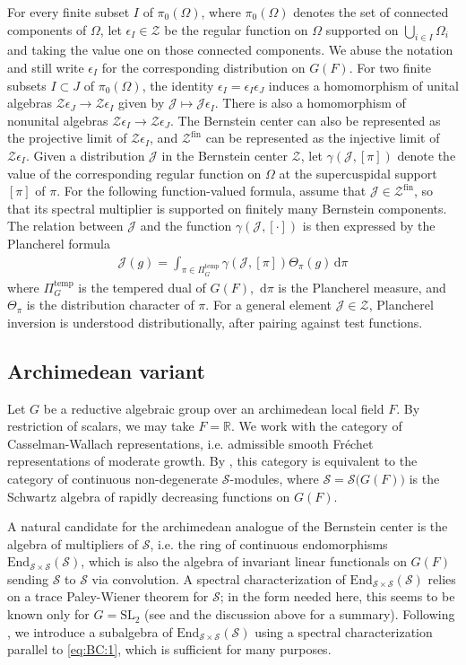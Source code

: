\documentclass[iccmp]{ipbook}
\newcommand{\BR}{{\mathbb {R}}}
\newcommand{\CJ}{{\mathcal {J}}}
\newcommand{\CS}{{\mathcal {S}}}
\newcommand{\CZ}{{\mathcal {Z}}}
\newcommand{\End}{{\mathrm{End}}}
\newcommand{\SL}{{\mathrm{SL}}}
\newcommand{\ud}{\,\mathrm{d}}
\def\eps{{\epsilon}}
\def\Ome{{\Omega}}
\def\gam{{\gamma}}
\newcommand{\fin}{\mathrm{fin}}
\def\temp{\mathrm{temp}}
\begin{document}
For every finite subset $I$ of $\pi_0(\Ome)$, where $\pi_0(\Ome)$ denotes the set of connected components of $\Ome$, let $\eps_I\in \CZ$ be the regular function on $\Ome$ supported on $\bigcup_{i\in I}\Ome_i$ and taking the value one on those connected components. We abuse the notation and still write $\eps_I$ for the corresponding distribution on $G(F)$. For two finite subsets $I\subset J$ of $\pi_0(\Ome)$, the identity $\eps_I = \eps_I\eps_J$ induces a homomorphism of unital algebras $\CZ\eps_J\to \CZ\eps_I$ given by $\CJ\mapsto \CJ\eps_I$. There is also a homomorphism of nonunital algebras $\CZ\eps_I\to \CZ\eps_J$. The Bernstein center can also be represented as the projective limit of $\CZ\eps_I$, and $\CZ^\fin$ can be represented as the injective limit of $\CZ\eps_I$. Given a distribution $\CJ$ in the Bernstein center $\CZ$, let $\gam(\CJ,[\pi])$ denote the value of the corresponding regular function on $\Ome$ at the supercuspidal support $[\pi]$ of $\pi$. For the following function-valued formula, assume that $\CJ\in\CZ^\fin$, so that its spectral multiplier is supported on finitely many Bernstein components. The relation between $\CJ$ and the function $\gam(\CJ,[\cdot])$ is then expressed by the Plancherel formula
\begin{align}\label{eq:BC:1}
\CJ(g) = \int_{\pi\in \Pi_G^\temp}
\gam(\CJ,[\pi]) \Theta_\pi(g)\ud \pi
\end{align}
where $\Pi^\temp_G$ is the tempered dual of $G(F)$, $\ud\pi$ is the Plancherel measure, and $\Theta_\pi$ is the distribution character of $\pi$. For a general element $\CJ\in\CZ$, Plancherel inversion is understood distributionally, after pairing against test functions.

\subsection{Archimedean variant}\label{subsubsec:archiBC}

Let $G$ be a reductive algebraic group over an archimedean local field $F$. By restriction of scalars, we may take $F=\BR$. We work with the category of Casselman-Wallach representations, i.e. admissible smooth Fréchet representations of moderate growth. By \cite[Prop.~2.20]{bkglobalization}, this category is equivalent to the category of continuous non-degenerate $\CS$-modules, where $\CS = \CS\big(G(F)\big)$ is the Schwartz algebra of rapidly decreasing functions on $G(F)$.

A natural candidate for the archimedean analogue of the Bernstein center is the algebra of multipliers of $\CS$, i.e. the ring of continuous endomorphisms $\End_{\CS\times \CS}(\CS)$, which is also the algebra of invariant linear functionals on $G(F)$ sending $\CS$ to $\CS$ via convolution. A spectral characterization of $\End_{\CS\times \CS}(\CS)$ relies on a trace Paley-Wiener theorem for $\CS$; in the form needed here, this seems to be known only for $G=\SL_2$ (see \cite[Remark~3.4.1]{LN} and the discussion above for a summary). Following \cite[\S 2]{MR4298750}, we introduce a subalgebra of $\End_{\CS\times \CS}(\CS)$ using a spectral characterization parallel to \eqref{eq:BC:1}, which is sufficient for many purposes.
\end{document}
